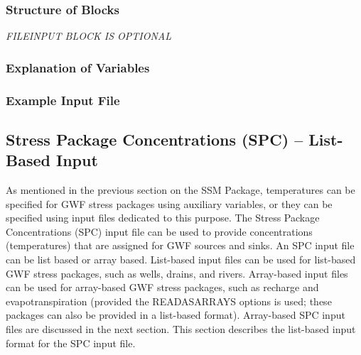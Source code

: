 \vspace{5mm}
\subsubsection{Structure of Blocks}


\vspace{5mm}
\noindent \textit{FILEINPUT BLOCK IS OPTIONAL}


\vspace{5mm}
\subsubsection{Explanation of Variables}
\begin{description}

\end{description}

\vspace{5mm}
\subsubsection{Example Input File}



\newpage
\subsection{Stress Package Concentrations (SPC) -- List-Based Input}
As mentioned in the previous section on the SSM Package, temperatures can be specified for GWF stress packages using auxiliary variables, or they can be specified using input files dedicated to this purpose.  The Stress Package Concentrations (SPC) input file can be used to provide concentrations (temperatures) that are assigned for GWF sources and sinks.  An SPC input file can be list based or array based.  List-based input files can be used for list-based GWF stress packages, such as wells, drains, and rivers.  Array-based input files can be used for array-based GWF stress packages, such as recharge and evapotranspiration (provided the READASARRAYS options is used; these packages can also be provided in a list-based format).  Array-based SPC input files are discussed in the next section.  This section describes the list-based input format for the SPC input file.  

